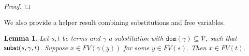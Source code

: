 \documentclass{lmcs}
\theoremstyle{theorem}\newtheorem{theorem}{Theorem}
\theoremstyle{theorem}\newtheorem{lemma}[theorem]{Lemma}
\theoremstyle{theorem}\newtheorem{corollary}[theorem]{Corollary}
\theoremstyle{definition}\newtheorem{definition}[theorem]{Definition}
\theoremstyle{definition}\newtheorem{example}[theorem]{Example}
\newcommand{\V}{\mathcal{V}}
\newcommand{\M}{\mathcal{M}}
\newcommand{\FV}{\mathit{FV}}
\newcommand{\FMV}{\mathit{MV}}
\newcommand{\domain}{\mathtt{dom}}
\newcommand{\avar}{x}
\newcommand{\bvar}{y}
\newcommand{\cvar}{z}
\newcommand{\Avar}{X}
\begin{document}
\begin{proof}
\end{proof}

We also provide a helper result combining substitutions and free variables.

\begin{lemma}\label{lem:varinsubstitute}
Let $s,t$ be terms and $\gamma$ a substitution with $\domain(\gamma) \subseteq
\V$, such that $\mathsf{subst}(s,\gamma,t)$.
Suppose $\avar \in \FV(\gamma(\bvar))$ for some $\bvar \in \FV(s)$.
Then $\avar \in \FV(t)$.
\end{lemma}
\end{document}
